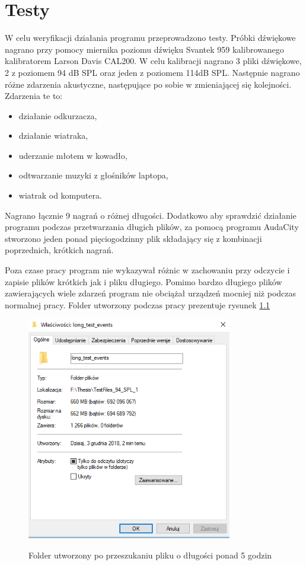 \documentclass[eng,printmode]{mgr}
\begin{document}
\chapter{Testy} \label{testy}
W celu weryfikacji działania programu przeprowadzono testy. Próbki dźwiękowe nagrano przy pomocy miernika poziomu dźwięku Svantek 959 kalibrowanego kalibratorem Larson Davis CAL200. W celu kalibracji nagrano 3 pliki dźwiękowe, 2 z poziomem 94 dB SPL oraz jeden z poziomem 114dB SPL. Następnie nagrano różne zdarzenia akustyczne, następujące po sobie w zmieniającej się kolejności. Zdarzenia te to:
\begin{itemize}
\item działanie odkurzacza,
\item działanie wiatraka,
\item uderzanie młotem w kowadło,
\item odtwarzanie muzyki z głośników laptopa,
\item wiatrak od komputera.
\end{itemize}

Nagrano łącznie 9 nagrań o różnej długości. Dodatkowo aby sprawdzić działanie programu podczas przetwarzania długich plików, za pomocą programu AudaCity stworzono jeden ponad pięciogodzinny plik składający się z kombinacji poprzednich, krótkich nagrań.

Poza czase pracy program nie wykazywał różnic w zachowaniu przy odczycie i zapisie plików krótkich jak i pliku długiego. Pomimo bardzo długiego plików zawierających wiele zdarzeń program nie obciążał urządzeń mocniej niż podczas normalnej pracy. Folder utworzony podczas pracy prezentuje rysunek \ref{dlugiewyniki}

\begin{figure}[hbtp]
\caption{Folder utworzony po przeszukaniu pliku o długości ponad 5 godzin}
\centering
\includegraphics[width=0.8\textwidth]{long_file_found.PNG}
\label{dlugiewyniki}
\end{figure}
\end{document}
